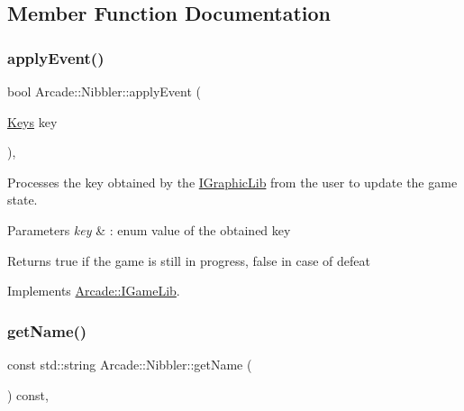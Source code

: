 \subsection{Member Function Documentation}
\mbox{\label{class_arcade_1_1_nibbler_a979cdf9080be6cb60bf1b4e757029845}} 
\subsubsection{\texorpdfstring{apply\+Event()}{applyEvent()}}
{\footnotesize\ttfamily bool Arcade\+::\+Nibbler\+::apply\+Event (\begin{DoxyParamCaption}\item[{\hyperlink{namespace_arcade_a9b501908b20bc993e4f8226db5323c41}{Keys}}]{key }\end{DoxyParamCaption})\hspace{0.3cm}{\ttfamily [final]}, {\ttfamily [virtual]}}



Processes the key obtained by the \hyperlink{class_arcade_1_1_i_graphic_lib}{I\+Graphic\+Lib} from the user to update the game state. 


\begin{DoxyParams}{Parameters}
{\em key} & \+: enum value of the obtained key \\
\hline
\end{DoxyParams}
\begin{DoxyReturn}{Returns}
true if the game is still in progress, false in case of defeat 
\end{DoxyReturn}


Implements \hyperlink{class_arcade_1_1_i_game_lib_a3b1b66ec00899b4c9efcd6151bf2497e}{Arcade\+::\+I\+Game\+Lib}.

\mbox{\label{class_arcade_1_1_nibbler_abbd3cd2246448056bc84b5b893f325d4}} 
\subsubsection{\texorpdfstring{get\+Name()}{getName()}}
{\footnotesize\ttfamily const std\+::string Arcade\+::\+Nibbler\+::get\+Name (\begin{DoxyParamCaption}{ }\end{DoxyParamCaption}) const\hspace{0.3cm}{\ttfamily [final]}, {\ttfamily [virtual]}}



